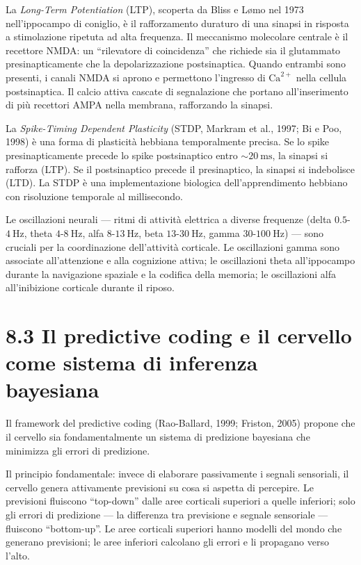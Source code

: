 \documentclass[11.5pt,a4paper,openany]{book}
\theoremstyle{remark}
\begin{document}
La \textit{Long-Term Potentiation} (LTP), scoperta da Bliss e Lømo nel 1973 nell'ippocampo di coniglio, è il rafforzamento duraturo di una sinapsi in risposta a stimolazione ripetuta ad alta frequenza. Il meccanismo molecolare centrale è il recettore NMDA: un ``rilevatore di coincidenza'' che richiede sia il glutammato presinapticamente che la depolarizzazione postsinaptica. Quando entrambi sono presenti, i canali NMDA si aprono e permettono l'ingresso di $\text{Ca}^{2+}$ nella cellula postsinaptica. Il calcio attiva cascate di segnalazione che portano all'inserimento di più recettori AMPA nella membrana, rafforzando la sinapsi.

La \textit{Spike-Timing Dependent Plasticity} (STDP, Markram et al., 1997; Bi e Poo, 1998) è una forma di plasticità hebbiana temporalmente precisa. Se lo spike presinapticamente precede lo spike postsinaptico entro $\sim 20\ \text{ms}$, la sinapsi si rafforza (LTP). Se il postsinaptico precede il presinaptico, la sinapsi si indebolisce (LTD). La STDP è una implementazione biologica dell'apprendimento hebbiano con risoluzione temporale al millisecondo.

Le oscillazioni neurali --- ritmi di attività elettrica a diverse frequenze (delta $0.5$-$4\ \text{Hz}$, theta $4$-$8\ \text{Hz}$, alfa $8$-$13\ \text{Hz}$, beta $13$-$30\ \text{Hz}$, gamma $30$-$100\ \text{Hz}$) --- sono cruciali per la coordinazione dell'attività corticale. Le oscillazioni gamma sono associate all'attenzione e alla cognizione attiva; le oscillazioni theta all'ippocampo durante la navigazione spaziale e la codifica della memoria; le oscillazioni alfa all'inibizione corticale durante il riposo.

\section{8.3 Il predictive coding e il cervello come sistema di inferenza bayesiana}

Il framework del predictive coding (Rao-Ballard, 1999; Friston, 2005) propone che il cervello sia fondamentalmente un sistema di predizione bayesiana che minimizza gli errori di predizione.

Il principio fondamentale: invece di elaborare passivamente i segnali sensoriali, il cervello genera attivamente previsioni su cosa si aspetta di percepire. Le previsioni fluiscono ``top-down'' dalle aree corticali superiori a quelle inferiori; solo gli errori di predizione --- la differenza tra previsione e segnale sensoriale --- fluiscono ``bottom-up''. Le aree corticali superiori hanno modelli del mondo che generano previsioni; le aree inferiori calcolano gli errori e li propagano verso l'alto.
\end{document}

